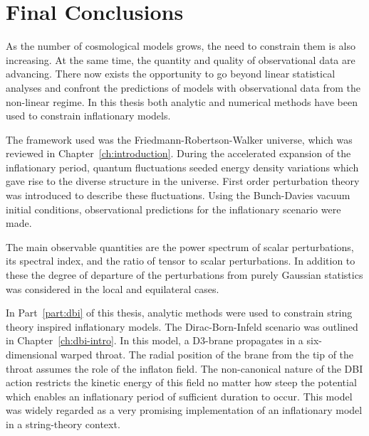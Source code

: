 \renewcommand{\CVSrevision}%
{\version$Id: theend.tex,v 1.8 2009/11/09 19:16:26 ith Exp $}

\chapter{Final Conclusions}
\label{ch:conclusions}

As the number of cosmological models grows, the need to constrain them is also
increasing. At the same time, the quantity and quality of observational data are
advancing. There now exists the opportunity to go beyond linear statistical analyses
and confront the predictions of models with observational data from the non-linear
regime. In this thesis both analytic and numerical methods have been used to
constrain inflationary models.

The framework used was the Friedmann-Robertson-Walker universe, which was reviewed
in Chapter~\ref{ch:introduction}. During the accelerated expansion of the
inflationary period, quantum fluctuations seeded energy density variations which
gave rise to the diverse structure in the universe. First order perturbation theory
was introduced to describe these fluctuations. Using the Bunch-Davies vacuum initial
conditions, observational predictions for the inflationary scenario were made.

The main observable quantities are the power spectrum of scalar perturbations, its
spectral index, and the ratio of tensor to scalar perturbations. In addition to
these the degree of departure of the perturbations from purely Gaussian statistics
was considered in the local and equilateral cases.


\pagebreak

In Part~\ref{part:dbi} of this thesis, analytic methods were used to constrain
string theory inspired inflationary models. The Dirac-Born-Infeld scenario was
outlined in Chapter~\ref{ch:dbi-intro}. In this model, a D3-brane propagates in a
six-dimensional warped throat. The radial position of the brane from the tip of the
throat assumes the role of the inflaton field. The non-canonical nature of the DBI
action restricts the kinetic energy of this field no matter how steep the potential
which enables an inflationary period of sufficient duration to occur.
This model was widely regarded as a very promising implementation of an inflationary
model in a string-theory context.

